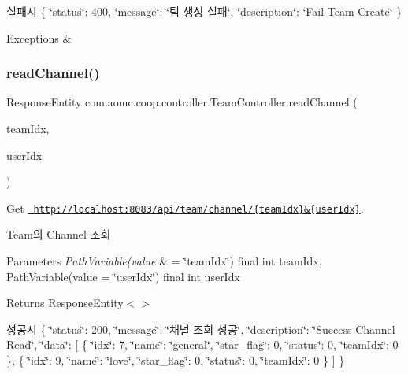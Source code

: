 실패시 \{ \char`\"{}status\char`\"{}\+: 400, \char`\"{}message\char`\"{}\+: \char`\"{}팀 생성 실패\char`\"{}, \char`\"{}description\char`\"{}\+: \char`\"{}\+Fail Team Create\char`\"{} \}


\begin{DoxyExceptions}{Exceptions}
{\em } & \\
\hline
\end{DoxyExceptions}
\mbox{\label{classcom_1_1aomc_1_1coop_1_1controller_1_1_team_controller_a890d22a6a53400482037c0587483b67d}} 
\subsubsection{\texorpdfstring{readChannel()}{readChannel()}}
{\footnotesize\ttfamily Response\+Entity com.\+aomc.\+coop.\+controller.\+Team\+Controller.\+read\+Channel (\begin{DoxyParamCaption}\item[{@Path\+Variable(value=\char`\"{}team\+Idx\char`\"{}) final int}]{team\+Idx,  }\item[{@Path\+Variable(value=\char`\"{}user\+Idx\char`\"{}) final int}]{user\+Idx }\end{DoxyParamCaption})}



Get \href{http://localhost:8083/api/team/channel/{teamIdx}&{userIdx}}{\texttt{ http\+://localhost\+:8083/api/team/channel/\{team\+Idx\}\&\{user\+Idx\}}}. 

Team의 Channel 조회


\begin{DoxyParams}{Parameters}
{\em Path\+Variable(value} & = \char`\"{}team\+Idx\char`\"{}) final int team\+Idx, Path\+Variable(value = \char`\"{}user\+Idx\char`\"{}) final int user\+Idx\\
\hline
\end{DoxyParams}
\begin{DoxyReturn}{Returns}
Response\+Entity$<$$>$
\end{DoxyReturn}
성공시 \{ \char`\"{}status\char`\"{}\+: 200, \char`\"{}message\char`\"{}\+: \char`\"{}채널 조회 성공\char`\"{}, \char`\"{}description\char`\"{}\+: \char`\"{}\+Success Channel Read\char`\"{}, \char`\"{}data\char`\"{}\+: \mbox{[} \{ \char`\"{}idx\char`\"{}\+: 7, \char`\"{}name\char`\"{}\+: \char`\"{}general\char`\"{}, \char`\"{}star\+\_\+flag\char`\"{}\+: 0, \char`\"{}status\char`\"{}\+: 0, \char`\"{}team\+Idx\char`\"{}\+: 0 \}, \{ \char`\"{}idx\char`\"{}\+: 9, \char`\"{}name\char`\"{}\+: \char`\"{}love\char`\"{}, \char`\"{}star\+\_\+flag\char`\"{}\+: 0, \char`\"{}status\char`\"{}\+: 0, \char`\"{}team\+Idx\char`\"{}\+: 0 \} \mbox{]} \}

